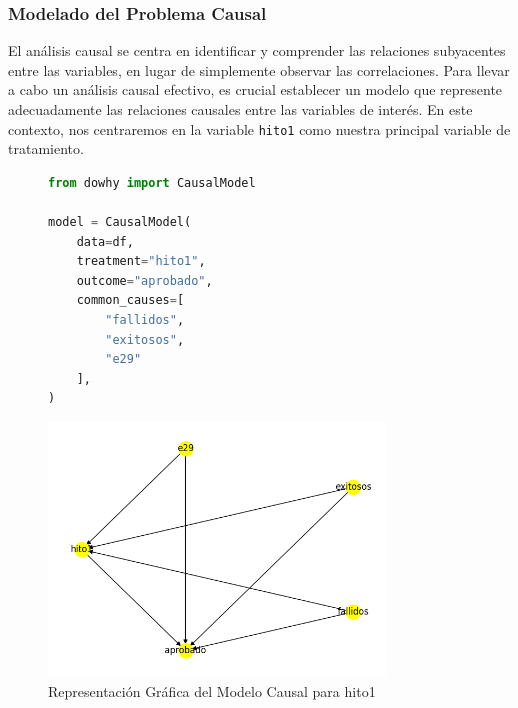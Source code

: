 \subsubsection{Modelado del Problema Causal}

El análisis causal se centra en identificar y comprender las relaciones subyacentes entre las variables, en lugar de simplemente observar las correlaciones. Para llevar a cabo un análisis causal efectivo, es crucial establecer un modelo que represente adecuadamente las relaciones causales entre las variables de interés. En este contexto, nos centraremos en la variable \texttt{hito1} como nuestra principal variable de tratamiento.

\begin{figure}[H]
    \centering
    \begin{minipage}{0.48\textwidth}
        \begin{lstlisting}[language=Python, caption=Construcción del Modelo Causal para hito1, label=lst:model_causalHito1]
from dowhy import CausalModel

model = CausalModel(
    data=df,
    treatment="hito1",
    outcome="aprobado",
    common_causes=[
        "fallidos",
        "exitosos",
        "e29"
    ],
)
        \end{lstlisting}
    \end{minipage}
    \hfill
    \begin{minipage}{0.48\textwidth}
        \centering
        \includegraphics[width=0.8\textwidth]{img/causalidad/graph_causal_model_hito1.png}
        \caption{Representación Gráfica del Modelo Causal para hito1}
        \label{fig:modelo_causal_hito1}
    \end{minipage}
\end{figure}


